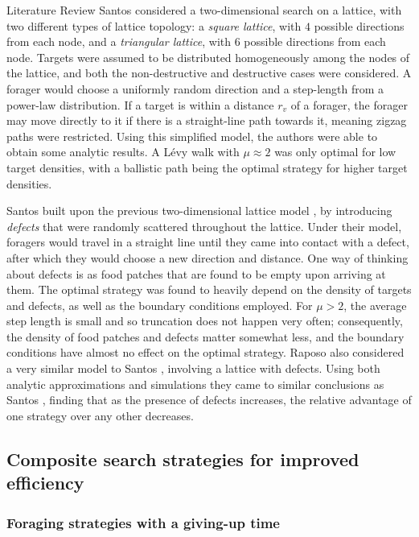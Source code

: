 \begin{section}{Literature Review \label{sec:litreview}}
Santos \etal \cite{Santos_2005} considered a two-dimensional search on a lattice, with two different types of lattice topology: a \emph{square lattice}, with $4$ possible directions from each node, and a \emph{triangular lattice}, with $6$ possible directions from each node.
Targets were assumed to be distributed homogeneously among the nodes of the lattice, and both the non-destructive and destructive cases were considered.
A forager would choose a uniformly random direction and a step-length from a power-law distribution.
If a target is within a distance $r_v$ of a forager, the forager may move directly to it if there is a straight-line path towards it, meaning zigzag paths were restricted.
Using this simplified model, the authors were able to obtain some analytic results.
A L\'{e}vy walk with $\mu \approx 2$ was only optimal for low target densities, with a ballistic path being the optimal strategy for higher target densities.

Santos \etal \cite{Santos_2008} \etal built upon the previous two-dimensional lattice model \cite{Santos_2005}, by introducing \emph{defects} that were randomly scattered throughout the lattice.
Under their model, foragers would travel in a straight line until they came into contact with a defect, after which they would choose a new direction and distance. One way of thinking about defects is as food patches that are found to be empty upon arriving at them.
The optimal strategy was found to heavily depend on the density of targets and defects, as well as the boundary conditions employed.
For $\mu >2$, the average step length is small and so truncation does not happen very often; consequently, the density of food patches and defects matter somewhat less, and the boundary conditions have almost no effect on the optimal strategy.
Raposo \etal \cite{Raposo_2009} also considered a very similar model to Santos \etal \cite{Santos_2008}, involving a lattice with defects.
Using both analytic approximations and simulations they came to similar conclusions as Santos \etal \cite{Santos_2008}, finding that as the presence of defects increases, the relative advantage of one strategy over any other decreases.

\subsection{Composite search strategies for improved efficiency}

\subsubsection{Foraging strategies with a giving-up time}


\end{section}
